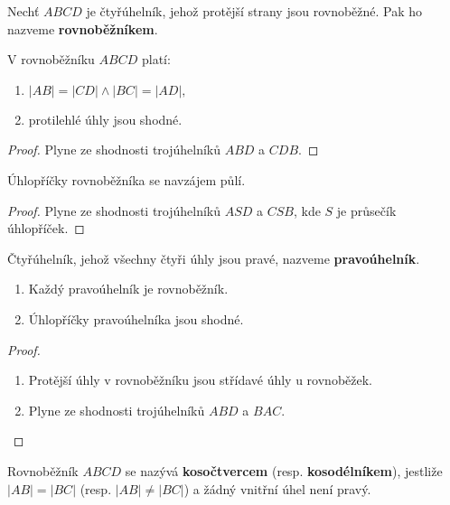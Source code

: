 \begin{definition}
  Nechť $ABCD$ je čtyřúhelník, jehož protější strany jsou rovnoběžné. Pak ho nazveme \textbf{rovnoběžníkem}.
\end{definition}

\begin{veta}
  V rovnoběžníku $ABCD$ platí:
  \begin{enumerate}[$i.$]
    \item $|AB|=|CD| \land |BC|=|AD|,$
    \item protilehlé úhly jsou shodné.
  \end{enumerate}
\end{veta}

\begin{proof}
  Plyne ze shodnosti trojúhelníků $ABD$ a $CDB.$
\end{proof}

\begin{veta}
  Úhlopříčky rovnoběžníka se navzájem půlí.
\end{veta}


\begin{proof}
  Plyne ze shodnosti trojúhelníků $ASD$ a $CSB$, kde $S$ je průsečík úhlopříček.
\end{proof}

\begin{definition}
  Čtyřúhelník, jehož všechny čtyři úhly jsou pravé, nazveme \textbf{pravoúhelník}.
\end{definition}

\begin{veta}
  \begin{enumerate}[$i.$]
    \item Každý pravoúhelník je rovnoběžník.
    \item Úhlopříčky pravoúhelníka jsou shodné.
  \end{enumerate}
\end{veta}

\begin{proof}
  \begin{enumerate}[$i.$]
    \item Protější úhly v rovnoběžníku jsou střídavé úhly u rovnoběžek.
    \item Plyne ze shodnosti trojúhelníků $ABD$ a $BAC$.\qedhere
  \end{enumerate}
\end{proof}

\begin{definition}
  Rovnoběžník $ABCD$ se nazývá \textbf{kosočtvercem} (resp. \textbf{kosodélníkem}), jestliže $|AB|=|BC|$ (resp. $|AB| \neq |BC|$) a žádný vnitřní úhel není pravý.
\end{definition}



